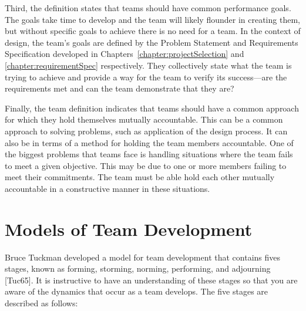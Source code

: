 Third, the definition states that teams should have common performance
goals. The goals take time to develop and the team will likely flounder
in creating them, but without specific goals to achieve there is no need
for a team. In the context of design, the team's goals are defined by
the Problem Statement and Requirements Specification developed in
Chapters~\ref{chapter:projectSelection} and \ref{chapter:requirementSpec} 
respectively. They collectively state what the team is
trying to achieve and provide a way for the team to verify its
success---are the requirements met and can the team demonstrate that
they are?

Finally, the team definition indicates that teams should have a common
approach for which they hold themselves mutually accountable. This can
be a common approach to solving problems, such as application of the
design process. It can also be in terms of a method for holding the team
members accountable. One of the biggest problems that teams face is
handling situations where the team fails to meet a given objective. This
may be due to one or more members failing to meet their commitments. The
team must be able hold each other mutually accountable in a constructive
manner in these situations.

\section{Models of Team Development}
\label{section:models-of-team-development}

Bruce Tuckman developed a model for team development that contains fives
stages, known as forming, storming, norming, performing, and adjourning
{[}Tuc65{]}. It is instructive to have an understanding of these stages
so that you are aware of the dynamics that occur as a team develops. The
five stages are described as follows:

